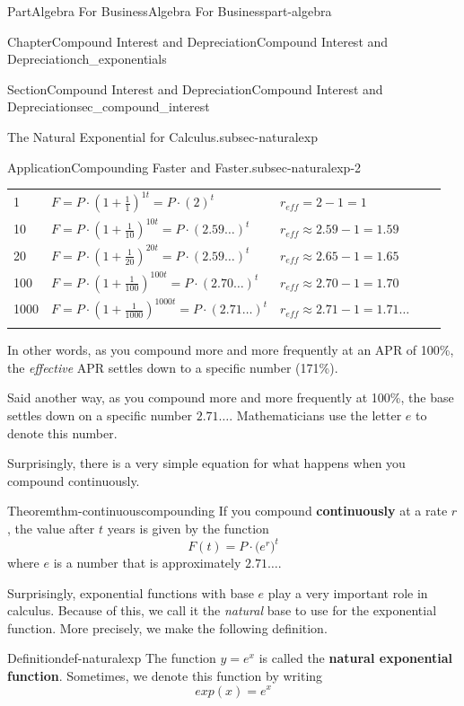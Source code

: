\documentclass[oneside,10pt,]{tufte-book}
\newcommand{\terminology}[1]{\textbf{#1}}
\numberwithin{equation}{chapter}
\newcommand{\hrulemedium}{\noalign{\hrule height 0.07em}}
\begin{document}
\begin{partptx}{Part}{Algebra For Business}{}{Algebra For Business}{}{}{part-algebra}
\begin{chapterptx}{Chapter}{Compound Interest and Depreciation}{}{Compound Interest and Depreciation}{}{}{ch_exponentials}
\begin{sectionptx}{Section}{Compound Interest and Depreciation}{}{Compound Interest and Depreciation}{}{}{sec_compound_interest}
\begin{paragraphs}{The Natural Exponential for Calculus.}{subsec-naturalexp}
\begin{insight}{Application}{Compounding Faster and Faster.}{subsec-naturalexp-2}
\begin{center}
{\begin{tabular}{lBlBl}
1&\(F = P\cdot(1+\frac{1}{1})^{1t} = P\cdot (2)^t\)&\(r_{eff} = 2- 1 = 1\)\tabularnewline\hrulemedium
10&\(F = P\cdot(1+\frac{1}{10})^{10t} = P\cdot (2.59\dots)^t\)&\(r_{eff} \approx 2.59-1 = 1.59\)\tabularnewline\hrulemedium
20&\(F = P\cdot(1+\frac{1}{20})^{20t} = P\cdot (2.59\dots)^t\)&\(r_{eff}\approx 2.65-1 = 1.65\)\tabularnewline\hrulemedium
100&\(F = P\cdot(1+\frac{1}{100})^{100t} = P\cdot (2.70\dots)^t\)&\(r_{eff}\approx 2.70-1 = 1.70\)\tabularnewline\hrulemedium
1000&\(F = P\cdot(1+\frac{1}{1000})^{1000t} = P\cdot (2.71\dots)^t\)&\(r_{eff}\approx 2.71-1=1.71\dots\)\tabularnewline\hrulemedium
\end{tabular}
}%
\end{center}%
In other words, as you compound more and more frequently at an APR of 100\%, the \emph{effective} APR settles down to a specific number (171\%).%
\par
Said another way, as you compound more and more frequently at 100\%, the base settles down on a specific number \(2.71\dots\). Mathematicians use the letter \(e\) to denote this number.%
\end{insight}
Surprisingly, there is a very simple equation for what happens when you compound continuously.%
\begin{theorem}{Theorem}{}{}{thm-continuouscompounding}%
If you compound \terminology{continuously} at a rate \(r\), the value after \(t\) years is given by the function%
\begin{equation*}
F(t) = P\cdot \Big(e^r\Big)^t
\end{equation*}
where \(e\) is a number that is approximately \(2.71\dots\).%
\end{theorem}
Surprisingly, exponential functions with base \(e\) play a very important role in calculus.  Because of this, we call it the \emph{natural} base to use for the exponential function.  More precisely, we make the following definition.%
\begin{definition}{Definition}{}{def-naturalexp}%
The function \(y = e^{x}\) is called the \terminology{natural exponential function}.  Sometimes, we denote this function by writing%
\begin{equation*}
exp(x) = e^x
\end{equation*}
%
\end{definition}
\end{paragraphs}%
\end{sectionptx}
\end{chapterptx}
%
\typeout{************************************************}

\end{partptx}
\end{document}
